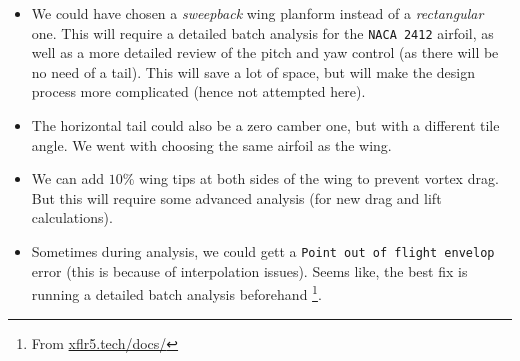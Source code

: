 \begin{itemize}
    \item We could have chosen a \emph{sweepback} wing planform instead of a \emph{rectangular} one. This will require a detailed batch analysis for the \texttt{NACA 2412} airfoil, as well as a more detailed review of the pitch and yaw control (as there will be no need of a tail). This will save a lot of space, but will make the design process more complicated (hence not attempted here).
    \item The horizontal tail could also be a zero camber one, but with a different tile angle. We went with choosing the same airfoil as the wing.
    \item We can add $10\%$ wing tips at both sides of the wing to prevent vortex drag. But this will require some advanced analysis (for new drag and lift calculations).
    \item Sometimes during analysis, we could gett a \texttt{Point out of flight envelop} error (this is because of interpolation issues). Seems like, the best fix is running a detailed batch analysis beforehand \footnote{From \href{https://www.xflr5.tech/docs/Point_Out_Of_Flight_Envelope.pdf}{xflr5.tech/docs/}}.
\end{itemize}
